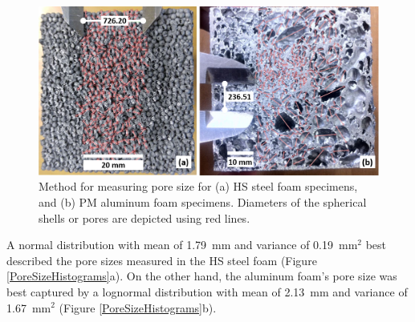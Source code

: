 \documentclass[review]{elsarticle}
\begin{document}
\begin{figure}[htbp]
	\begin{center}
		\includegraphics[width=0.80\linewidth]{Tex-Figures/Fig02a_b.png}
		\caption{Method for measuring pore size for (a) HS steel foam specimens, and (b) PM aluminum foam specimens. Diameters of the spherical shells or pores are depicted using red lines.}
		\label{PoreMeas}
	\end{center}
\end{figure}

A normal distribution with mean of 1.79~mm and variance of 0.19~mm$^2$ best described the pore sizes measured in the HS steel foam (Figure \ref{PoreSizeHistograms}a). On the other hand, the aluminum foam's pore size was best captured by a lognormal distribution with mean of 2.13~mm and variance of 1.67~mm$^2$ (Figure \ref{PoreSizeHistograms}b).
\end{document}
